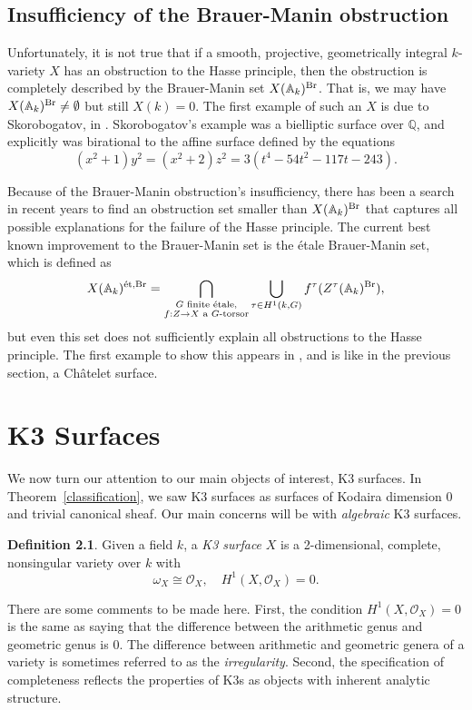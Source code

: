 \documentclass[12pt,twoside]{reedthesis}
\theoremstyle{plain}
\theoremstyle{definition}
\newtheorem{definition}{Definition}[section]
\theoremstyle{remark}
\newcommand{\Affine}{\mathbb{A}}
\newcommand{\QQ}{\mathbb{Q}}
\newcommand{\calO}{\mathcal{O}}
\newcommand{\Br}{\operatorname{Br}}
\newcommand{\adele}{\reflectbox{$\Affine$}}
\begin{document}
\section{Insufficiency of the Brauer-Manin obstruction}
Unfortunately, it is not true that if a smooth, projective, geometrically integral $k$-variety $X$ has an obstruction to the Hasse principle, then the obstruction is completely described by the Brauer-Manin set $X(\adele_k)^{\Br}$. That is, we may have $X(\adele_k)^{\Br}\neq\emptyset$ but still $X(k)=0$. The first example of such an $X$ is due to Skorobogatov, in \cite{skoEx}. Skorobogatov's example was a bielliptic surface over $\QQ$, and explicitly was birational to the affine surface defined by the equations
\[
(x^2+1)y^2=(x^2+2)z^2=3(t^4-54t^2-117t-243).
\]

Because of the Brauer-Manin obstruction's insufficiency, there has been a search in recent years to find an obstruction set smaller than $X(\adele_k)^{\Br}$ that captures all possible explanations for the failure of the Hasse principle. The current best known improvement to the Brauer-Manin set is the \'etale Brauer-Manin set, which is defined as
\[
X(\adele_k)^{\text{\'et},\Br}=\bigcap_{\substack{G \text{ finite \'etale,}\\ f:Z\to X\text{ a $G$-torsor}}}\bigcup_{\tau\in H^1(k,G)} f^\tau(Z^\tau(\adele_k)^{\Br}),
\]
but even this set does not sufficiently explain all obstructions to the Hasse principle. The first example to show this appears in \cite{poonenEtBrEx}, and is like in the previous section, a Ch\^atelet surface. 
\chapter{K3 Surfaces}
We now turn our attention to our main objects of interest, K3 surfaces. In Theorem~\ref{classification}, we saw K3 surfaces as surfaces of Kodaira dimension 0 and trivial canonical sheaf. Our main concerns will be with \emph{algebraic} K3 surfaces.
\begin{definition}
Given a field $k$, a \emph{K3 surface} $X$ is a 2-dimensional, complete, nonsingular variety over $k$ with \[\omega_X\cong\calO_X,\quad H^1(X,\calO_X)=0.\]
\end{definition}
\noindent There are some comments to be made here. First, the condition $H^1(X,\calO_X)=0$ is the same as saying that the difference between the arithmetic genus and geometric genus is 0. The difference between arithmetic and geometric genera of a variety is sometimes referred to as the \emph{irregularity}. Second, the specification of completeness reflects the properties of K3s as objects with inherent analytic structure. 
\end{document}
